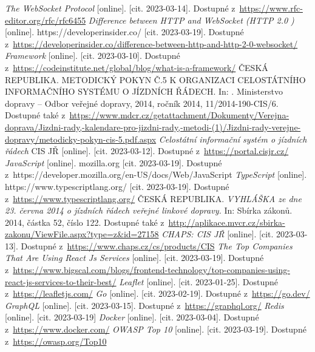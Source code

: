 \begin{thebibliography}{99}
     \textit{The WebSocket Protocol} [online]. [cit. 2023-03-14]. Dostupné z~\url{https://www.rfc-editor.org/rfc/rfc6455}
     \textit{Difference between HTTP and WebSocket (HTTP 2.0 )} [online]. https://developerinsider.co/ [cit. 2023-03-19]. Dostupné z~\url{https://developerinsider.co/difference-between-http-and-http-2-0-websocket/}
     \textit{Framework} [online]. [cit. 2023-03-10]. Dostupné z~\url{https://codeinstitute.net/global/blog/what-is-a-framework/}
     ČESKÁ REPUBLIKA. METODICKÝ POKYN Č.5 K ORGANIZACI CELOSTÁTNÍHO INFORMAČNÍHO SYSTÉMU O JÍZDNÍCH ŘÁDECH. In: . Ministerstvo dopravy – Odbor veřejné dopravy, 2014, ročník 2014, 11/2014-190-CIS/6. Dostupné také z~\url{https://www.mdcr.cz/getattachment/Dokumenty/Verejna-doprava/Jizdni-rady,-kalendare-pro-jizdni-rady,-metodi-(1)/Jizdni-rady-verejne-dopravy/metodicky-pokyn-cis-5.pdf.aspx}
     \textit{Celostátní informační systém o jízdních řádech} CIS JŘ [online]. [cit. 2023-03-12]. Dostupné z~\url{https://portal.cisjr.cz/}
     \textit{JavaScript} [online]. mozilla.org [cit. 2023-03-19]. Dostupné z~{https://developer.mozilla.org/en-US/docs/Web/JavaScript}
     \textit{TypeScript} [online]. https://www.typescriptlang.org/ [cit. 2023-03-19]. Dostupné z~\url{https://www.typescriptlang.org/}
     ČESKÁ REPUBLIKA. \textit{VYHLÁŠKA ze dne 23. června 2014 o jízdních řádech veřejné linkové dopravy.} In: Sbírka zákonů. 2014, částka 52, číslo 122. Dostupné také z~\url{http://aplikace.mvcr.cz/sbirka-zakonu/ViewFile.aspx?type=z&id=27158}
     \textit{CHAPS: CIS JŘ} [online]. [cit. 2023-03-13]. Dostupné z~\url{https://www.chaps.cz/cs/products/CIS}
     \textit{The Top Companies That Are Using React Js Services} [online]. [cit. 2023-03-19]. Dostupné z~\url{https://www.bigscal.com/blogs/frontend-technology/top-companies-using-react-js-services-to-their-best/}
     \textit{Leaflet} [online]. [cit. 2023-01-25]. Dostupné z~\url{https://leafletjs.com/}
     \textit{Go} [online]. [cit. 2023-02-19]. Dostupné z~\url{https://go.dev/}
     \textit{GraphQL} [online]. [cit. 2023-03-15]. Dostupné z~\url{https://graphql.org/}
     \textit{Redis} [online]. [cit. 2023-03-19]
     \textit{Docker} [online]. [cit. 2023-03-04]. Dostupné z~\url{https://www.docker.com/}
     \textit{OWASP Top 10} [online]. [cit. 2023-03-19]. Dostupné z~\url{https://owasp.org/Top10}

\end{thebibliography}
